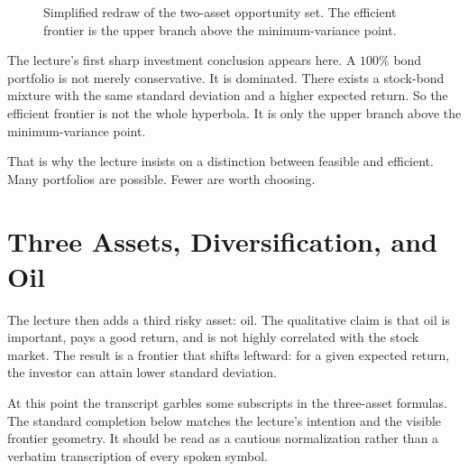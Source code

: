 \begin{figure}[h]
\centering
{}
\caption{Simplified redraw of the two-asset opportunity set. The efficient frontier is the upper branch above the minimum-variance point.}
\end{figure}

The lecture's first sharp investment conclusion appears here. A \(100\%\) bond portfolio is not merely conservative. It is dominated. There exists a stock-bond mixture with the same standard deviation and a higher expected return. So the efficient frontier is not the whole hyperbola. It is only the upper branch above the minimum-variance point.

That is why the lecture insists on a distinction between feasible and efficient. Many portfolios are possible. Fewer are worth choosing.

\section{Three Assets, Diversification, and Oil}

The lecture then adds a third risky asset: oil. The qualitative claim is that oil is important, pays a good return, and is not highly correlated with the stock market. The result is a frontier that shifts leftward: for a given expected return, the investor can attain lower standard deviation.

\begin{remark}
At this point the transcript garbles some subscripts in the three-asset formulas. The standard completion below matches the lecture's intention and the visible frontier geometry. It should be read as a cautious normalization rather than a verbatim transcription of every spoken symbol.
\end{remark}

